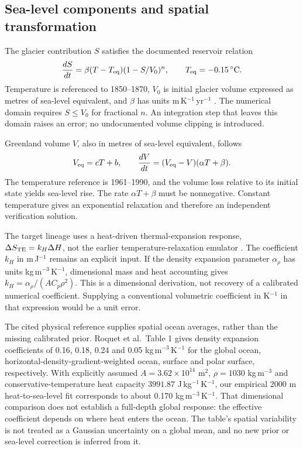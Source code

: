 \documentclass[11pt]{article}
\begin{document}
\subsection{Sea-level components and spatial transformation}

The glacier contribution $S$ satisfies the documented reservoir relation
\begin{equation}
\frac{dS}{dt}=\beta(T-T_{\rm eq})(1-S/V_0)^n,
\qquad T_{\rm eq}=-0.15\,{}^\circ\mathrm{C}.
\end{equation}
Temperature is referenced to 1850--1870, $V_0$ is initial glacier volume expressed
as metres of sea-level equivalent, and $\beta$ has units m\,K$^{-1}$\,yr$^{-1}$
\cite{brick}. The numerical domain requires $S\leq V_0$ for fractional $n$.
An integration step that leaves this domain raises an error; no undocumented
volume clipping is introduced.

Greenland volume $V$, also in metres of sea-level equivalent, follows
\begin{equation}
V_{\rm eq}=cT+b,\qquad
\frac{dV}{dt}=(V_{\rm eq}-V)(\alpha T+\beta).
\end{equation}
The temperature reference is 1961--1990, and the volume loss relative to its
initial state yields sea-level rise. The rate $\alpha T+\beta$ must be
nonnegative. Constant temperature gives an exponential relaxation and therefore
an independent verification solution.

The target lineage uses a heat-driven thermal-expansion response,
$\Delta S_{\rm TE}=k_H\Delta H$, not the earlier temperature-relaxation emulator
\cite{vega,darnell}. The coefficient $k_H$ in m\,J$^{-1}$ remains an explicit
input. If the density expansion parameter $\alpha_\rho$ has units
kg\,m$^{-3}$\,K$^{-1}$, dimensional mass and heat accounting gives
$k_H=\alpha_\rho/(A C_p\rho^2)$. This is a dimensional derivation, not recovery
of a calibrated numerical coefficient. Supplying a conventional volumetric
coefficient in K$^{-1}$ in that expression would be a unit error.

The cited physical reference supplies spatial ocean averages, rather than the
missing calibrated prior. Roquet et al.\ Table 1 \cite{roquet} gives density
expansion coefficients of 0.16, 0.18, 0.24 and 0.05 kg\,m$^{-3}$\,K$^{-1}$
for the global ocean, horizontal-density-gradient-weighted ocean, surface and
polar surface, respectively. With explicitly assumed $A=3.62\times10^{14}$
m$^2$, $\rho=1030$ kg\,m$^{-3}$ and conservative-temperature heat capacity
$3991.87$ J\,kg$^{-1}$\,K$^{-1}$, our empirical 2000 m heat-to-sea-level fit
corresponds to about 0.170 kg\,m$^{-3}$\,K$^{-1}$. That dimensional comparison
does not establish a full-depth global response: the effective coefficient
depends on where heat enters the ocean. The table's spatial variability is
not treated as a Gaussian uncertainty on a global mean, and no new prior or
sea-level correction is inferred from it.
\end{document}
